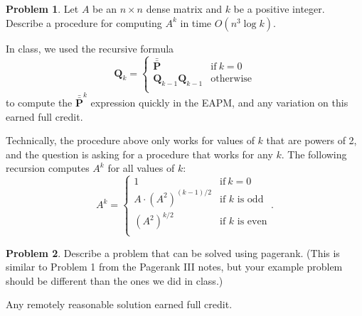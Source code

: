 \documentclass[10pt]{exam}
\theoremstyle{definition}
\newtheorem{problem}{Problem}
\newcommand{\Q}{\mathbf Q}
\newcommand{\p}{\mathbf P}
\newcommand{\pb}{\bar {\p}}
\newcommand{\pbb}{\bar {\pb}}
\begin{document}
\newpage
\begin{problem}
    Let $A$ be an $n\times n$ dense matrix and $k$ be a positive integer.
    Describe a procedure for computing $A^k$ in time $O(n^3\log k)$.
\end{problem}
    \begin{solution}
        In class, we used the recursive formula
        \begin{equation}
        \label{eq:Qk}
        \Q_k = 
        \begin{cases}
            \pbb & \text{if}~k=0 \\
            \Q_{k-1} \Q_{k-1} & \text{otherwise} \\
        \end{cases}
        \end{equation}
        to compute the $\pbb^k$ expression quickly in the EAPM, and any variation on this earned full credit.

        Technically, the procedure above only works for values of $k$ that are powers of 2, and the question is asking for a procedure that works for any $k$.
        The following recursion computes $A^k$ for all values of $k$:
    \begin{equation}
        \label{eq:Qk}
        A^k = 
        \begin{cases}
            1 & \text{if}~k=0 \\
            A \cdot (A^2)^{(k-1)/2} & \text{if $k$ is odd} \\
            (A^2)^{k/2} & \text{if $k$ is even} \\
        \end{cases}
        .
%
    \end{equation}
    \end{solution}

\newpage
\begin{problem}
    Describe a problem that can be solved using pagerank.
    (This is similar to Problem 1 from the Pagerank III notes, but your example problem should be different than the ones we did in class.)
\end{problem}
\begin{solution}
    Any remotely reasonable solution earned full credit.
\end{solution}
\end{document}
